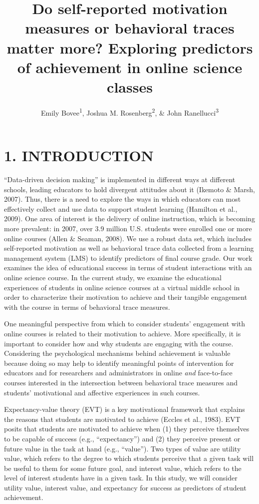 \documentclass[acmart]{apa6}
\title{Do self-reported motivation measures or behavioral traces matter more?
Exploring predictors of achievement in online science classes}
\author{Emily Bovee\textsuperscript{1}, Joshua M. Rosenberg\textsuperscript{2}, \& John Ranellucci\textsuperscript{3}}
\affiliation{
    \vspace{0.5cm}
          \textsuperscript{1} Michigan State University\\
          \textsuperscript{2} University of Tennessee, Knoxville\\
          \textsuperscript{3} Hunter College  }
\theoremstyle{definition}
\theoremstyle{definition}
\theoremstyle{definition}
\theoremstyle{remark}
\begin{document}
\maketitle

\setcounter{secnumdepth}{0}



\section{1. INTRODUCTION}\label{introduction}

\enquote{Data-driven decision making} is implemented in different ways
at different schools, leading educators to hold divergent attitudes
about it (Ikemoto \& Marsh, 2007). Thus, there is a need to explore the
ways in which educators can most effectively collect and use data to
support student learning (Hamilton et al., 2009). One area of interest
is the delivery of online instruction, which is becoming more prevalent:
in 2007, over 3.9 million U.S. students were enrolled one or more online
courses (Allen \& Seaman, 2008). We use a robust data set, which
includes self-reported motivation as well as behavioral trace data
collected from a learning management system (LMS) to identify predictors
of final course grade. Our work examines the idea of educational success
in terms of student interactions with an online science course. In the
current study, we examine the educational experiences of students in
online science courses at a virtual middle school in order to
characterize their motivation to achieve and their tangible engagement
with the course in terms of behavioral trace measures.

One meaningful perspective from which to consider students' engagement
with online courses is related to their motivation to achieve. More
specifically, it is important to consider how and why students are
engaging with the course. Considering the psychological mechanisms
behind achievement is valuable because doing so may help to identify
meaningful points of intervention for educators and for researchers and
administrators in online \emph{and} face-to-face courses interested in
the intersection between behavioral trace measures and students'
motivational and affective experiences in such courses.

Expectancy-value theory (EVT) is a key motivational framework that
explains the reasons that students are motivated to achieve (Eccles et
al., 1983). EVT posits that students are motivated to achieve when (1)
they perceive themselves to be capable of success (e.g.,
\enquote{expectancy}) and (2) they perceive present or future value in
the task at hand (e.g., \enquote{value}). Two types of value are utility
value, which refers to the degree to which students perceive that a
given task will be useful to them for some future goal, and interest
value, which refers to the level of interest students have in a given
task. In this study, we will consider utility value, interest value, and
expectancy for success as predictors of student achievement.
\end{document}

